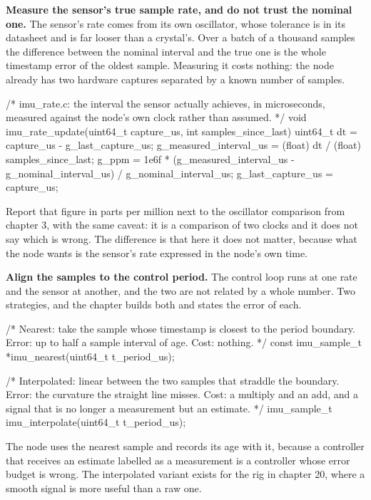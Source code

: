 \begin{steps}
\item \textbf{Measure the sensor's true sample rate, and do not trust the
nominal one.} The sensor's rate comes from its own oscillator, whose tolerance
is in its datasheet and is far looser than a crystal's. Over a batch of a
thousand samples the difference between the nominal interval and the true one is
the whole timestamp error of the oldest sample. Measuring it costs nothing: the
node already has two hardware captures separated by a known number of samples.
\begin{ccode}
/* imu_rate.c: the interval the sensor actually achieves, in microseconds,
   measured against the node's own clock rather than assumed. */
void imu_rate_update(uint64_t capture_us, int samples_since_last)
{
    uint64_t dt = capture_us - g_last_capture_us;
    g_measured_interval_us = (float) dt / (float) samples_since_last;
    g_ppm = 1e6f * (g_measured_interval_us - g_nominal_interval_us)
                 / g_nominal_interval_us;
    g_last_capture_us = capture_us;
}
\end{ccode}
Report that figure in parts per million next to the oscillator comparison from
chapter 3, with the same caveat: it is a comparison of two clocks and it does
not say which is wrong. The difference is that here it does not matter, because
what the node wants is the sensor's rate expressed in the node's own time.

\item \textbf{Align the samples to the control period.} The control loop runs at
one rate and the sensor at another, and the two are not related by a whole
number. Two strategies, and the chapter builds both and states the error of
each.
\begin{ccode}
/* Nearest: take the sample whose timestamp is closest to the period boundary.
   Error: up to half a sample interval of age. Cost: nothing. */
const imu_sample_t *imu_nearest(uint64_t t_period_us);

/* Interpolated: linear between the two samples that straddle the boundary.
   Error: the curvature the straight line misses. Cost: a multiply and an add,
   and a signal that is no longer a measurement but an estimate. */
imu_sample_t imu_interpolate(uint64_t t_period_us);
\end{ccode}
The node uses the nearest sample and records its age with it, because a
controller that receives an estimate labelled as a measurement is a controller
whose error budget is wrong. The interpolated variant exists for the rig in
chapter 20, where a smooth signal is more useful than a raw one.


\end{steps}
